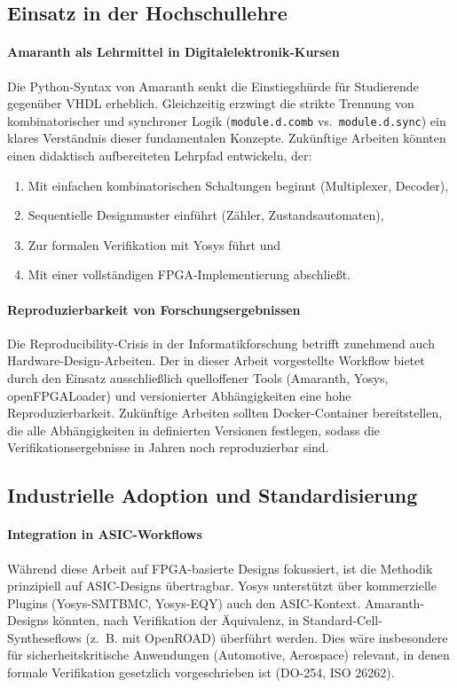 ﻿\documentclass[12pt,a4paper]{report}
\begin{document}
\subsection{Einsatz in der Hochschullehre}

\paragraph{Amaranth als Lehrmittel in Digitalelektronik-Kursen}
Die Python-Syntax von Amaranth senkt die Einstiegshürde für Studierende gegenüber
VHDL erheblich. Gleichzeitig erzwingt die strikte Trennung von kombinatorischer und
synchroner Logik (\texttt{module.d.comb} vs.\ \texttt{module.d.sync}) ein klares
Verständnis dieser fundamentalen Konzepte. Zukünftige Arbeiten könnten einen
didaktisch aufbereiteten Lehrpfad entwickeln, der:
\begin{enumerate}
    \item Mit einfachen kombinatorischen Schaltungen beginnt (Multiplexer, Decoder),
    \item Sequentielle Designmuster einführt (Zähler, Zustandsautomaten),
    \item Zur formalen Verifikation mit Yosys führt und
    \item Mit einer vollständigen FPGA-Implementierung abschließt.
\end{enumerate}

\paragraph{Reproduzierbarkeit von Forschungsergebnissen}
Die Reproducibility-Crisis in der Informatikforschung betrifft zunehmend auch
Hardware-Design-Arbeiten. Der in dieser Arbeit vorgestellte Workflow bietet durch den
Einsatz ausschließlich quelloffener Tools (Amaranth, Yosys, openFPGALoader) und
versionierter Abhängigkeiten eine hohe Reproduzierbarkeit. Zukünftige Arbeiten sollten
Docker-Container bereitstellen, die alle Abhängigkeiten in definierten Versionen
festlegen, sodass die Verifikationsergebnisse in Jahren noch reproduzierbar sind.

\subsection{Industrielle Adoption und Standardisierung}

\paragraph{Integration in ASIC-Workflows}
Während diese Arbeit auf FPGA-basierte Designs fokussiert, ist die Methodik prinzipiell
auf ASIC-Designs übertragbar. Yosys unterstützt über kommerzielle Plugins
(Yosys-SMTBMC, Yosys-EQY) auch den ASIC-Kontext. Amaranth-Designs könnten, nach
Verifikation der Äquivalenz, in Standard-Cell-Syntheseflows (z.~B. mit OpenROAD) 
überführt werden. Dies wäre insbesondere für sicherheitskritische Anwendungen
(Automotive, Aerospace) relevant, in denen formale Verifikation gesetzlich
vorgeschrieben ist (DO-254, ISO 26262).
\end{document}
